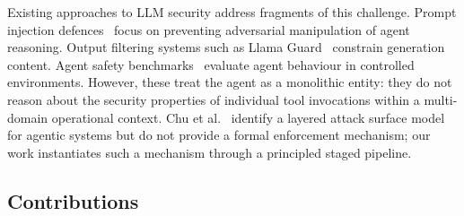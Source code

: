 \documentclass[10pt,a4paper,twocolumn]{article}
\begin{document}
Existing approaches to LLM security address fragments of this challenge. Prompt injection defences~\cite{liu2024formalizing, zhan2024injecagent} focus on preventing adversarial manipulation of agent reasoning. Output filtering systems such as Llama Guard~\cite{inan2023llamaguard} constrain generation content. Agent safety benchmarks~\cite{zhang2024agentsafetybench, yuan2024rjudge} evaluate agent behaviour in controlled environments. However, these treat the agent as a monolithic entity: they do not reason about the security properties of individual tool invocations within a multi-domain operational context. Chu et al.~\cite{chu2026stateless} identify a layered attack surface model for agentic systems but do not provide a formal enforcement mechanism; our work instantiates such a mechanism through a principled staged pipeline.

\subsection{Contributions}
\label{sec:contributions}
\end{document}
